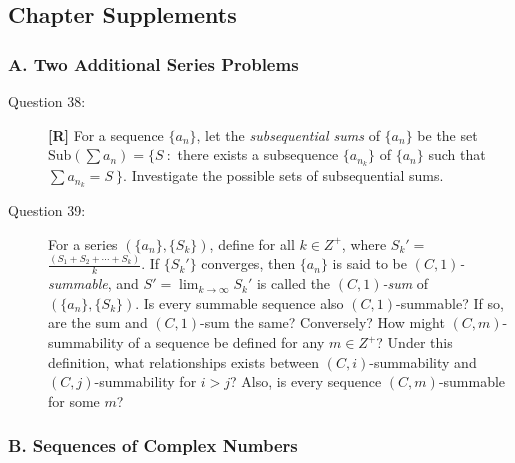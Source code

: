 \documentclass{article}
\begin{document}
\subsection*{Chapter Supplements}


\subsubsection*{A. Two Additional Series Problems}

\begin{description}

  \item[Question 38:] \textbf{[R]} For a sequence $\{ a_n \}$, let the \emph{subsequential sums} of $\{ a_n \}$ be the set $\text{Sub} (\sum a_n) = \{ S\ :$ there exists a subsequence $\{ a_{n_k} \}$ of $\{ a_n \}$ such that $\sum a_{n_k} = S\ \}$. Investigate the possible sets of subsequential sums.

  \item[Question 39:] For a series $( \{ a_n \} , \{ S_k \} )$, define for all $k \in Z^+$, where $S_k' =$ $\frac{(S_1 + S_2 + \cdots + S_k)}{k}$. If $\{ S_k' \}$ converges, then $\{ a_n \}$ is said to be \emph{$(C,1)$-summable}, and $\displaystyle S' = \lim_{k \to \infty} S_k'$ is called the \emph{$(C,1)$-sum} of $( \{ a_n \} , \{ S_k \} )$. Is every summable sequence also $(C,1)$-summable? If so, are the sum and $(C,1)$-sum the same? Conversely? How might $(C,m)$-summability of a sequence be defined for any $m \in Z^+$? Under this definition, what relationships exists between $(C,i)$-summability and $(C,j)$-summability for $i > j$? Also, is every sequence $(C,m)$-summable for some $m$?

\end{description}


\subsubsection*{B. Sequences of Complex Numbers}
\end{document}
